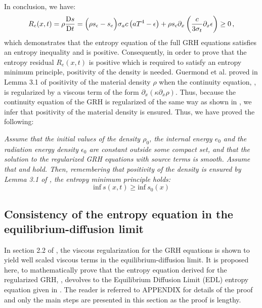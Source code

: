 \documentclass[times,doublespace]{fldauth}%
\begin{document}
In conclusion, we have: 
\begin{equation} \label{eq:ineq_ent_eq}
R_e(x,t) = \rho \frac{\textrm{D} s}{\textrm{D} t} = \Big( \rho s_\epsilon -s_e \Big)  \sigma_a c \left( a T^4 - \epsilon \right) +   \rho s_\epsilon \partial_x \left( \frac{c}{3 \sigma_t} \partial_x \epsilon \right) \geq 0 \,,
\end{equation}
which demonstrates that the entropy equation of the full GRH equations satisfies an entropy inequality and is positive. Consequently, in order to prove that the entropy residual $R_e(x,t)$ is positive which is required to satisfy an entropy minimum principle, positivity of the density is needed. Guermond et al. proved in Lemma 3.1 of \cite{jlg} positivity of the material density $\rho$ when the continuity equation, , is regularized by a viscous term of the form $\partial_x ( \kappa \partial_x \rho )$. Thus, because the continuity equation of the GRH is regularized of the same way as shown in , we infer that positivity of the material density is ensured. Thus, we have proved the following:
%
\begin{theorem}
\emph{Assume that the initial values of the density $\rho_0$, the internal energy $e_0$ and the radiation energy density $\epsilon_0$ are constant outside some compact set, and that the solution to the regularized GRH equations with source terms is smooth. Assume that  and  hold. Then, remembering that positivity of the density is ensured by Lemma 3.1 of \cite{jlg}, the entropy minimum principle holds:
\begin{equation}
\text{inf} \ s(x,t) \geq \text{inf} \ s_0(x)
\end{equation}}
\end{theorem}
%
\subsection{Consistency of the entropy equation in the equilibrium-diffusion limit}
\label{sec:cons-equi-diff-limit}
%
In section 2.2 of \cite{our_jcp_radhy_paper}, the viscous regularization for the GRH equations is shown to yield well scaled viscous terms in the equilibrium-diffusion limit. It is proposed here, to mathematically prove that the entropy equation derived for the regularized GRH, , devolves to the Equilibrium Diffusion Limit (EDL) entropy equation given in . The reader is referred to APPENDIX for details of the proof and only the main steps are presented in this section as the proof is lengthy. 
\end{document}
